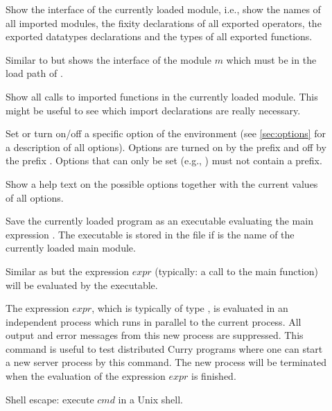 \begin{description}
\item[]
Show the interface of the currently loaded
module, i.e., show the names of all imported modules,
the fixity declarations of all exported operators,
the exported datatypes declarations and the types
of all exported functions.

\item[]
Similar to 
but shows the interface of the module $m$
which must be in the load path of \CYS.

\item[]
Show all calls to imported functions in the currently loaded module.
This might be useful to see which import declarations are really necessary.

\item[]
Set or turn on/off a specific option
of the \CYS environment (see \ref{sec:options} for a description
of all options). Options are turned on by the prefix
\ccode{+} and off by the prefix \ccode{-}. Options that can only
be set (e.g., ) must not contain a prefix.

\item[]
Show a help text on the possible options
together with the current values of all options.

\item[] Save the currently loaded
program as an executable evaluating the main expression .
The executable is stored in the file 
if  is the name of the currently loaded main module.

\item[] Similar as 
but the expression $expr$ (typically: a call to the main
function) will be evaluated by the executable.

\item[]
The expression $expr$, which is typically of type ,
is evaluated in an independent process which runs in
parallel to the current \CYS process.
All output and error messages from this new process are suppressed.
This command is useful to test distributed Curry programs
where one can start
a new server process by this command. The new process
will be terminated when the evaluation of the expression $expr$
is finished.

\item[] Shell escape: execute $cmd$ in a Unix shell.

\end{description}

